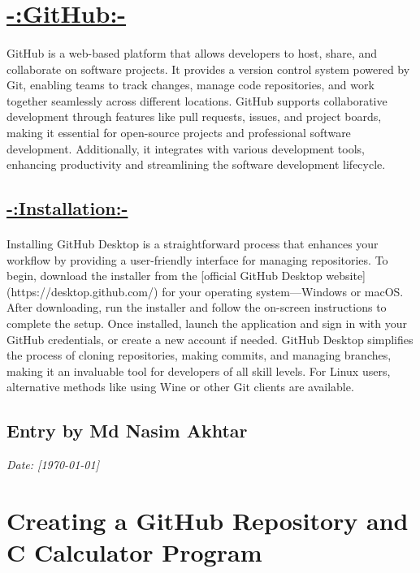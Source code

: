 \documentclass[a4paper,12pt]{article}
\begin{document}
\section*{\Huge{\underline{{-:GitHub:-}}}}
\paragraph{\noindent}{GitHub is a web-based platform that allows developers to host, share, and collaborate on software projects. It provides a version control system powered by Git, enabling teams to track changes, manage code repositories, and work together seamlessly across different locations. GitHub supports collaborative development through features like pull requests, issues, and project boards, making it essential for open-source projects and professional software development. Additionally, it integrates with various development tools, enhancing productivity and streamlining the software development lifecycle.}

\subsection*{\underline{-:Installation:-}}
\paragraph{\setlength{\parindent}{0pt}}{Installing GitHub Desktop is a straightforward process that enhances your workflow by providing a user-friendly interface for managing repositories. To begin, download the installer from the [official GitHub Desktop website](https://desktop.github.com/) for your operating system—Windows or macOS. After downloading, run the installer and follow the on-screen instructions to complete the setup. Once installed, launch the application and sign in with your GitHub credentials, or create a new account if needed. GitHub Desktop simplifies the process of cloning repositories, making commits, and managing branches, making it an invaluable tool for developers of all skill levels. For Linux users, alternative methods like using Wine or other Git clients are available.}

\subsection*{Entry by Md Nasim Akhtar}
\textit{Date: [\today]}\\


\section*{Creating a GitHub Repository and C Calculator Program}
\end{document}
